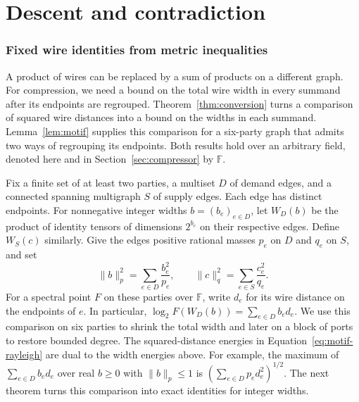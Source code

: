 \part{Descent and contradiction}


\section{Fixed wire identities from metric inequalities}
\label{sec:motifs}

A product of wires can be replaced by a sum of products on a different
graph. For compression, we need a bound on the total wire width in
every summand after its endpoints are regrouped. Theorem~\ref{thm:conversion} turns a comparison
of squared wire distances into a bound on the widths in each summand.
Lemma~\ref{lem:motif} supplies this comparison for a six-party graph
that admits two ways of regrouping its endpoints. Both results hold
over an arbitrary field, denoted here and in Section~\ref{sec:compressor}
by $\mathbb F$.

Fix a finite set of at least two parties, a multiset $D$ of demand edges,
and a connected spanning multigraph $S$ of supply edges. Each edge has distinct endpoints.
For nonnegative integer widths $b=(b_e)_{e\in D}$,
let $W_D(b)$ be the product of identity tensors of dimensions $2^{b_e}$
on their respective edges. Define $W_S(c)$ similarly. Give the edges
positive rational masses $p_e$ on $D$ and $q_e$ on $S$, and set
\[
  \|b\|_p^2=\sum_{e\in D}\frac{b_e^2}{p_e},\qquad
  \|c\|_q^2=\sum_{e\in S}\frac{c_e^2}{q_e}.
\]
For a spectral point $F$ on these parties over $\mathbb F$, write $d_e$ for its
wire distance on the endpoints of $e$. In particular,
$\log_2 F(W_D(b))=\sum_{e\in D}b_e d_e$.
We use this comparison on six parties to shrink the total width and later on a block of ports to restore bounded degree.
The squared-distance energies in Equation~\eqref{eq:motif-rayleigh} are dual to the width energies above. For
example, the maximum of $\sum_{e\in D}b_e d_e$ over real $b\ge0$ with
$\|b\|_p\le1$ is $(\sum_{e\in D}p_e d_e^2)^{1/2}$.
The next theorem turns this comparison into exact identities for
integer widths.

